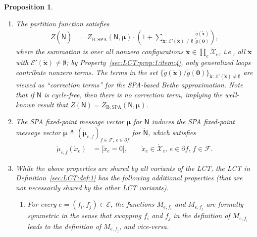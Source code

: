 \documentclass[journal]{IEEEtran}
\newcommand{\add}[1]{{\color{black}#1}}
\newtheorem{proposition}[theorem]{Proposition}
\newcommand{\vect}[1]{ \bm{#1} }
\newcommand{\setF}{ \mathcal{F} }
\newcommand{\setpf}{ \partial f }
\newcommand{\vmu}{ \vect{ \mu } }
\newcommand{\graphN}{ \mathsf{N} }
\newcommand{\setE}{ \mathcal{E} }
\newcommand{\defeq}{ \triangleq }
\newcommand{\ZBSPA}{ Z_{\mathrm{B,SPA}} }
\newcommand{\LCTset}[1]{\mathring{\mathcal{#1}}}
\newcommand{\LCTv}[1]{ \mathring{ \vect{#1} } }
\newcommand{\LCT}[1]{ \mathring{#1} }
\newcommand{\ef}{ e,f }
\newcommand{\efi}{ e,f_i }
\newcommand{\efj}{ e,f_j }
\newcommand{\LCTsetxe}{ \LCTset{X}_{e} }
\newcommand*{\ie}{\textit{i.e.}}
\begin{document}
\begin{proposition}
\begin{enumerate}
    \item\label{sec:LCT:prop:1:item:5} \add{The partition function satisfies}
          \begin{align*}
            Z(\LCT{\graphN})
             & = \ZBSPA(\graphN,\vmu)
            \cdot
            \left(
            1
            +
            \sum_{\LCTv{x}:\, \setE'(\LCTv{x}) \neq \emptyset }
            \frac{\LCT{g}(\LCTv{x})}
            {\LCT{g}(\vect{0})}
            \right),
          \end{align*}
          \add{where the summation is over all nonzero configurations $\LCTv{x} \in \prod_{e} \LCTsetxe$, \ie, all $\LCTv{x}$ with $\setE'(\LCTv{x}) \neq \emptyset$; by Property~\ref{sec:LCT:prop:1:item:4}, only generalized loops contribute nonzero terms.} The terms in the set
          $
            \bigl\{ \LCT{g}(\LCTv{x})/\LCT{g}(\vect{0})
            \bigr\}_{\! \LCTv{x}:\, \setE'(\LCTv{x}) \neq \emptyset}
          $
          are viewed as ``correction terms'' for the SPA-based Bethe approximation. Note
          that if $\graphN$ is cycle-free, then there is no correction term,
          implying the well-known result that
          $Z(\graphN) = \ZBSPA(\graphN,\vmu)$.

    \item\label{sec:LCT:prop:1:item:6} \add{The SPA fixed-point message
            vector $\vmu $ for $\graphN$ induces the SPA fixed-point message
            vector $\LCTv{\mu} \defeq ( \LCTv{\mu}_{\ef} )_{f \in \setF,\,e \in
                \setpf}$ for $\LCT{\graphN}$, which satisfies}
          \begin{align*}
            \LCT{\mu}_{e,f}(\LCT{x}_{e})
             & = \bigl[ \LCT{x}_{e} \! = \! 0 \bigr],
            \qquad
            \LCT{x}_{e} \in \LCTset{X}_{e}, \,
            e \in \setpf, \, f \in \setF.
          \end{align*}

    \item\label{sec:LCT:prop:1:item:7} While the above properties are shared by all variants of the LCT, the
          LCT in Definition~\ref{sec:LCT:def:1} has the following additional
          properties (that are not necessarily shared by the other LCT variants).
          \begin{enumerate}

            \item For every $e = (f_{i},f_{j}) \in \setE$, the functions $M_{\efi}$ and
                  $M_{\efj}$ are formally symmetric in the sense that swapping $f_{i}$ and
                  $f_{j}$ in the definition of $M_{\efi}$ leads to the definition of
                  $M_{\efj}$, and vice-versa.


\end{enumerate}
\end{enumerate}
\end{proposition}
\end{document}
